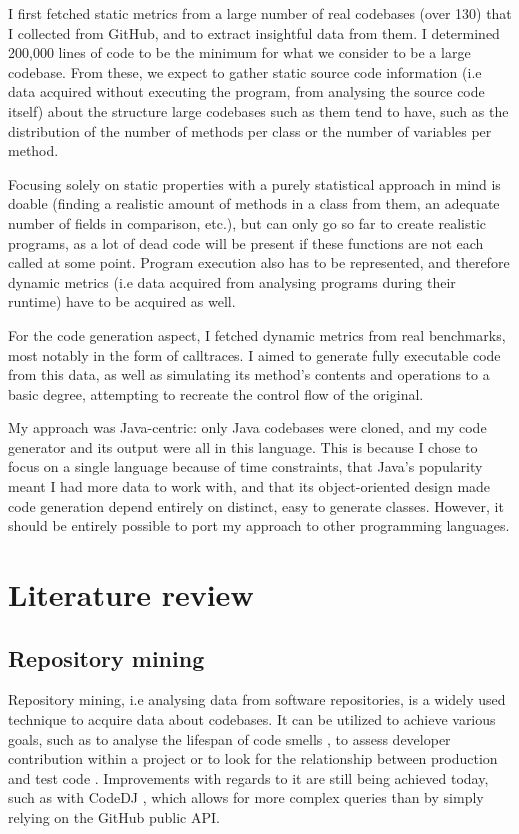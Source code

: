 \documentclass[12pt]{article}
\begin{document}
\bigskip
I first fetched static metrics from a large number of real codebases (over 130) that I collected from GitHub, and to extract insightful data from them. I determined 200,000 lines of code to be the minimum for what we consider to be a large codebase. From these, we expect to gather static source code information (i.e data acquired without executing the program, from analysing the source code itself) about the structure large codebases such as them tend to have, such as the distribution of the number of methods per class or the number of variables per method. 

Focusing solely on static properties with a purely statistical approach in mind is doable (finding a realistic amount of methods in a class from them, an adequate number of fields in comparison, etc.), but can only go so far to create realistic programs, as a lot of dead code will be present if these functions are not each called at some point. Program execution also has to be represented, and therefore dynamic metrics (i.e data acquired from analysing programs during their runtime) have to be acquired as well.

For the code generation aspect, I fetched dynamic metrics from real benchmarks, most notably in the form of calltraces. I aimed to generate fully executable code from this data, as well as simulating its method's contents and operations to a basic degree, attempting to recreate the control flow of the original.

My approach was Java-centric: only Java codebases were cloned, and my code generator and its output were all in this language. This is because I chose to focus on a single language because of time constraints, that Java's popularity meant I had more data to work with, and that its object-oriented design made code generation depend entirely on distinct, easy to generate classes. However, it should be entirely possible to port my approach to other programming languages.

\clearpage
\section{Literature review}
\subsection{Repository mining}
Repository mining, i.e analysing data from software repositories, is a widely used technique to acquire data about codebases. It can be utilized to achieve various goals, such as to analyse the lifespan of code smells \cite{code-smells-repo-mining}, to assess developer contribution within a project \cite{dev-contribution-repo-mining} or to look for the relationship between production and test code \cite{prod-test-repo-mining}. Improvements with regards to it are still being achieved today, such as with CodeDJ \cite{codedj}, which allows for more complex queries than by simply relying on the GitHub public API. 
\end{document}
